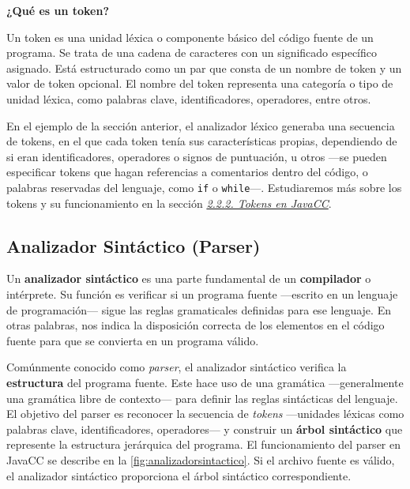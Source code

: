 \lstset{inputencoding=utf8/latin1}



\phantom{text}

\noindent \textbf{¿Qué es un token?}

\phantom{text}


\noindent Un token es una unidad léxica o componente básico del código fuente de un programa. Se trata de una cadena de caracteres con un significado específico asignado. Está estructurado como un par que consta de un nombre de token y un valor de token opcional. El nombre del token representa una categoría o tipo de unidad léxica, como palabras clave, identificadores, operadores, entre otros\cite{token}.

En el ejemplo de la sección anterior, el analizador léxico generaba una secuencia de tokens, en el que cada token tenía sus características propias, dependiendo de si eran identificadores, operadores o signos de puntuación, u otros ---se pueden especificar tokens que hagan referencias a comentarios dentro del código, o palabras reservadas del lenguaje, como \lstinline[keywordstyle=\color{black}]|if| o \lstinline[keywordstyle=\color{black}]|while|---. Estudiaremos más sobre los tokens y su funcionamiento en la sección \hyperref[sec:tokensenjavacc]{\textit{2.2.2. Tokens en JavaCC}}.


\subsection{Analizador Sintáctico (Parser)}
\noindent Un \textbf{analizador sintáctico} es una parte fundamental de un \textbf{compilador} o intérprete. Su función es verificar si un programa fuente ---escrito en un lenguaje de programación--- sigue las reglas gramaticales definidas para ese lenguaje\cite{analizadorsintactico}. En otras palabras, nos indica la disposición correcta de los elementos en el código fuente para que se convierta en un programa válido.

Comúnmente conocido como \textit{parser}, el analizador sintáctico verifica la \textbf{estructura} del programa fuente. Este hace uso de una gramática ---generalmente una gramática libre de contexto--- para definir las reglas sintácticas del lenguaje. El objetivo del parser es reconocer la secuencia de \textit{tokens} ---unidades léxicas como palabras clave, identificadores, operadores--- y construir un \textbf{árbol sintáctico} que represente la estructura jerárquica del programa. El funcionamiento del parser en JavaCC se describe en la \autoref{fig:analizadorsintactico}. Si el archivo fuente es válido, el analizador sintáctico proporciona el árbol sintáctico correspondiente.

